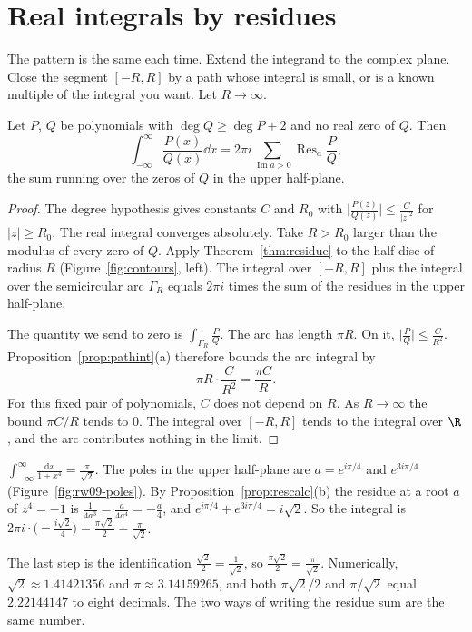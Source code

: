 \section{Real integrals by residues}

The pattern is the same each time. Extend the integrand to the complex plane. Close the segment $[-R,R]$ by a path whose integral is small, or is a known multiple of the integral you want. Let $R\to\infty$.

\begin{proposition}\label{prop:rationalint}
Let $P$, $Q$ be polynomials with $\deg Q\ge\deg P+2$ and no real zero of $Q$. Then
\[
\int_{-\infty}^\infty\frac{P(x)}{Q(x)}\dd x=2\pi i\sum_{\operatorname{Im}a>0}\operatorname{Res}_a\frac PQ,
\]
the sum running over the zeros of $Q$ in the upper half-plane.
\end{proposition}
\begin{proof}
The degree hypothesis gives constants $C$ and $R_0$ with $\bigl|\frac{P(z)}{Q(z)}\bigr|\le\frac C{|z|^2}$ for $|z|\ge R_0$. The real integral converges absolutely. Take $R>R_0$ larger than the modulus of every zero of $Q$. Apply Theorem~\ref{thm:residue} to the half-disc of radius $R$ (Figure~\ref{fig:contours}, left). The integral over $[-R,R]$ plus the integral over the semicircular arc $\Gamma_R$ equals $2\pi i$ times the sum of the residues in the upper half-plane.

The quantity we send to zero is $\int_{\Gamma_R}\frac{P}{Q}$. The arc has length $\pi R$. On it, $\bigl|\frac{P}{Q}\bigr|\le\frac C{R^2}$. Proposition~\ref{prop:pathint}(a) therefore bounds the arc integral by
\[
\pi R\cdot\frac C{R^2}=\frac{\pi C}R.
\]
For this fixed pair of polynomials, $C$ does not depend on $R$. As $R\to\infty$ the bound $\pi C/R$ tends to $0$. The integral over $[-R,R]$ tends to the integral over $\R$, and the arc contributes nothing in the limit.
\end{proof}

\begin{example}
$\int_{-\infty}^\infty\frac{\mathrm dx}{1+x^4}=\frac\pi{\sqrt2}$. The poles in the upper half-plane are $a=e^{i\pi/4}$ and $e^{3i\pi/4}$ (Figure~\ref{fig:rw09-poles}). By Proposition~\ref{prop:rescalc}(b) the
residue at a root $a$ of $z^4=-1$ is $\frac1{4a^3}=\frac a{4a^4}=-\frac a4$, and $e^{i\pi/4}+e^{3i\pi/4}=i\sqrt2$. So the integral is $2\pi i\cdot\bigl(-\frac{i\sqrt2}4\bigr)=\frac{\pi\sqrt2}2=\frac\pi{\sqrt2}$.
\end{example}

The last step is the identification $\frac{\sqrt2}2=\frac1{\sqrt2}$, so $\frac{\pi\sqrt2}2=\frac\pi{\sqrt2}$. Numerically, $\sqrt2\approx1.41421356$ and $\pi\approx3.14159265$, and both $\pi\sqrt2/2$ and $\pi/\sqrt2$ equal $2.22144147$ to eight decimals. The two ways of writing the residue sum are the same number.

